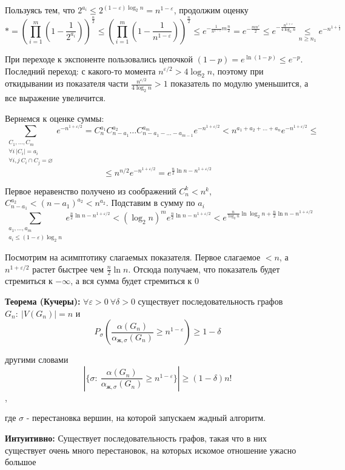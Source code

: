 \par Пользуясь тем, что $2^{a_i} \leq 2^{(1-\varepsilon)\log_2 n} = n^{1-\varepsilon}$, продолжим оценку
$$*=\left(\prod_{i=1}^m \left(1-\frac{1}{2^{a_i}}\right)\right)^{\frac{n}{2}} \leq \left(\prod_{i=1}^m \left(1-\frac{1}{n^{1-\varepsilon}}\right)\right)^{\frac{n}{2}} \leq e^{-\frac{1}{n^{1-\varepsilon}}m \frac{n}{2}}=e^{-\frac{mn^\varepsilon}{2}}\leq e^{-\frac{n^{1+\varepsilon}}{4\log_2 n}} \underset{n \geq n_1}{\leq} e^{-n^{1+\frac{\varepsilon}{2}}}$$

\par При переходе к экспоненте пользовались цепочкой $(1-p)=e^{\ln{(1-p)}}\leq e^{-p}$. Последний переход: с какого-то момента $n^{\varepsilon/2} > 4\log_2 n$, поэтому при откидывании из показателя части $\frac{n^{\varepsilon/2}}{4 \log_2 n}>1$ показатель по модулю уменьшится, а все выражение увеличится.

\par Вернемся к оценке суммы: 
$$\sum_{\substack{C_1, \ldots, C_m \\ \forall i \: |C_i|=a_i \\ \forall i, j \: C_i \cap C_j = \varnothing}} e^{-n^{1+\varepsilon/2}}=C_n^{a_1} C_{n-a_1}^{a_2}\ldots C_{n-a_1-\ldots-a_{m-1}}^{a_m}e^{-n^{1+\varepsilon/2}} < n^{a_1+a_2+\ldots+a_n}e^{-n^{1+\varepsilon/2}} \leq$$ $$\leq n^{n/2}e^{-n^{1+\varepsilon/2}}=e^{\frac{n}{2}\ln{n}-n^{1+\varepsilon/2}}$$

\par Первое неравенство получено из соображений $C_n^k < n^k$, $C_{n-a_1}^{a_2}<(n-a_1)^{a_2}<n^{a_2}$. Подставим в сумму по $a_i$
$$\sum_{\substack{a_1, \ldots, a_m \\ a_i \leq (1-\varepsilon)\log_2 n}} e^{\frac{n}{2}\ln{n}-n^{1+\varepsilon/2}} < (\log_2 n)^m e^{\frac{n}{2}\ln{n}-n^{1+\varepsilon/2}} < e^{\frac{n}{\log_2 n}\ln{\log_2 n}+\frac{n}{2}\ln{n}-n^{1+\varepsilon/2}}$$

\par Посмотрим на асимптотику слагаемых показателя. Первое слагаемое $<n$, а $n^{1+\varepsilon/2}$ растет быстрее чем $\frac{n}{2}\ln{n}$. Отсюда получаем, что показатель будет стремиться к $-\infty$, а вся сумма будет стремиться к 0 \EndProof

\par \textbf{Теорема (Кучеры):} $\forall \varepsilon>0 \: \forall \delta > 0$ существует последовательность графов $G_n: \: |V(G_n)|=n$ и $$P_\sigma\left(\frac{\alpha(G_n)}{\alpha_{\text{ж}, \sigma}(G_n)} \geq n^{1-\varepsilon}\right) \geq 1-\delta$$
\par другими словами $$|\{\sigma: \: \frac{\alpha(G_n)}{\alpha_{\text{ж}, \sigma}(G_n)} \geq n^{1-\varepsilon}\}| \geq (1-\delta) n!$$,
\par где $\sigma$ - перестановка вершин, на которой запускаем жадный алгоритм.

\par \textbf{Интуитивно:} Существует последовательность графов, такая что в них существует очень много перестановок, на которых искомое отношение ужасно большое